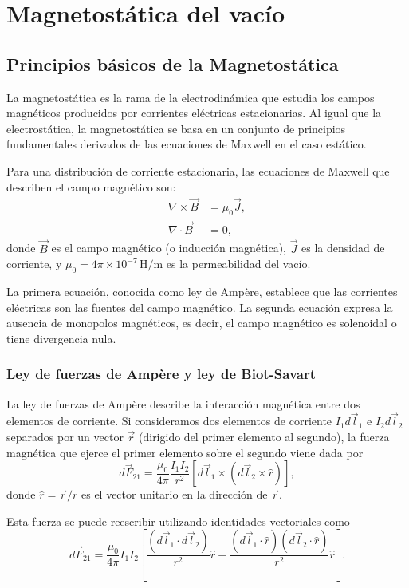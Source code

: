 \documentclass[12pt,a4paper]{book}
\begin{document}
\chapter{Magnetostática del vacío}
\section{Principios básicos de la Magnetostática}

La magnetostática es la rama de la electrodinámica que estudia los campos magnéticos producidos por corrientes eléctricas estacionarias. Al igual que la electrostática, la magnetostática se basa en un conjunto de principios fundamentales derivados de las ecuaciones de Maxwell en el caso estático.

Para una distribución de corriente estacionaria, las ecuaciones de Maxwell que describen el campo magnético son:
\begin{align}
\nabla \times \vec{B} &= \mu_0 \vec{J},\\
\nabla \cdot \vec{B} &= 0,
\end{align}
donde $\vec{B}$ es el campo magnético (o inducción magnética), $\vec{J}$ es la densidad de corriente, y $\mu_0 = 4\pi \times 10^{-7} \, \textrm{H/m}$ es la permeabilidad del vacío.

La primera ecuación, conocida como ley de Ampère, establece que las corrientes eléctricas son las fuentes del campo magnético. La segunda ecuación expresa la ausencia de monopolos magnéticos, es decir, el campo magnético es solenoidal o tiene divergencia nula.

\subsection{Ley de fuerzas de Ampère y ley de Biot-Savart}

La ley de fuerzas de Ampère describe la interacción magnética entre dos elementos de corriente. Si consideramos dos elementos de corriente $I_1 d\vec{l}_1$ e $I_2 d\vec{l}_2$ separados por un vector $\vec{r}$ (dirigido del primer elemento al segundo), la fuerza magnética que ejerce el primer elemento sobre el segundo viene dada por
\begin{equation}
d\vec{F}_{21} = \frac{\mu_0}{4\pi} \frac{I_1 I_2}{r^2} [d\vec{l}_1 \times (d\vec{l}_2 \times \hat{r})],
\end{equation}
donde $\hat{r} = \vec{r}/r$ es el vector unitario en la dirección de $\vec{r}$.

Esta fuerza se puede reescribir utilizando identidades vectoriales como
\begin{equation}
d\vec{F}_{21} = \frac{\mu_0}{4\pi} I_1 I_2 \left[ \frac{(d\vec{l}_1 \cdot d\vec{l}_2)}{r^2} \hat{r} - \frac{(d\vec{l}_1 \cdot \hat{r})(d\vec{l}_2 \cdot \hat{r})}{r^2} \hat{r} \right].
\end{equation}
\end{document}

